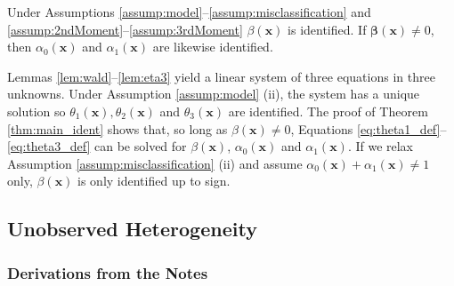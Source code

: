 \begin{thm}
  Under Assumptions \ref{assump:model}--\ref{assump:misclassification} and \ref{assump:2ndMoment}--\ref{assump:3rdMoment} $\beta(\mathbf{x})$ is identified.
  If $\mathbf{\beta}(\mathbf{x}) \neq 0$, then $\alpha_0(\mathbf{x})$ and $\alpha_1(\mathbf{x})$ are likewise identified.
  \label{thm:main_ident}
\end{thm}

Lemmas \ref{lem:wald}--\ref{lem:eta3} yield a linear system of three equations in three unknowns.
Under Assumption \ref{assump:model} (ii), the system has a unique solution so $\theta_1(\mathbf{x}), \theta_2(\mathbf{x})$ and $\theta_3(\mathbf{x})$ are identified.
The proof of Theorem \ref{thm:main_ident} shows that, so long as $\beta(\mathbf{x})\neq 0$, Equations \ref{eq:theta1_def}--\ref{eq:theta3_def} can be solved for $\beta(\mathbf{x})$, $\alpha_0(\mathbf{x})$ and $\alpha_1(\mathbf{x})$.
If we relax Assumption \ref{assump:misclassification} (ii) and assume $\alpha_0(\mathbf{x}) + \alpha_1(\mathbf{x}) \neq 1$ only, $\beta(\mathbf{x})$ is only identified up to sign.



\subsection{Unobserved Heterogeneity}
\label{sec:het}


\subsubsection{Derivations from the Notes}

